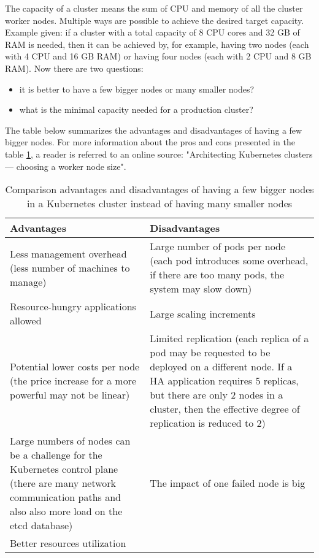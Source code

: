 The capacity of a cluster means the sum of CPU and memory of all the cluster worker nodes. Multiple ways are possible to achieve the desired target capacity. Example given: if a cluster with a total capacity of 8 CPU cores and 32 GB of RAM is needed, then it can be achieved by, for example, having two nodes (each with 4 CPU and 16 GB RAM) or having four nodes (each with 2 CPU and 8 GB RAM)\cite{kubernetes-node-size}. Now there are two questions:
\begin{itemize}
\item it is better to have a few bigger nodes or many smaller nodes?
\item what is the minimal capacity needed for a production cluster?
\end{itemize}

The table below summarizes the advantages and disadvantages of having a few bigger nodes. For more information about the pros and cons presented in the table \ref{tab:pros-cons-large-nodes}, a reader is referred to an online source: "Architecting Kubernetes clusters — choosing a worker node size"\cite{kubernetes-node-size}.

\begin{table}[H]
\begin{tabularx}{1\textwidth} {
  | >{\centering\arraybackslash}X
  | >{\centering\arraybackslash}X | }
 \hline
  \textbf{Advantages} & \textbf{Disadvantages}  \\
 \hline
 Less management overhead (less number of machines to manage)  & Large number of pods per node (each pod introduces some overhead, if there are too many pods, the system may slow down)   \\
 \hline
 Resource-hungry applications allowed  & Large scaling increments  \\
 \hline
  Potential lower costs per node (the price increase for a more powerful may not be linear)  & Limited replication (each replica of a pod may be requested to be deployed on a different node. If a HA application requires 5 replicas, but there are only 2 nodes in a cluster, then the effective degree of replication is reduced to 2)  \\
 \hline
  Large numbers of nodes can be a challenge for the Kubernetes control plane (there are many network communication paths and also also more load on the etcd database) & The impact of one failed node is big   \\
 \hline
  Better resources utilization &   \\
 \hline
\end{tabularx}
\caption{\label{tab:pros-cons-large-nodes}Comparison advantages and disadvantages of having a few bigger nodes in a Kubernetes cluster instead of having many smaller nodes\cite{kubernetes-node-size}}
\end{table}

